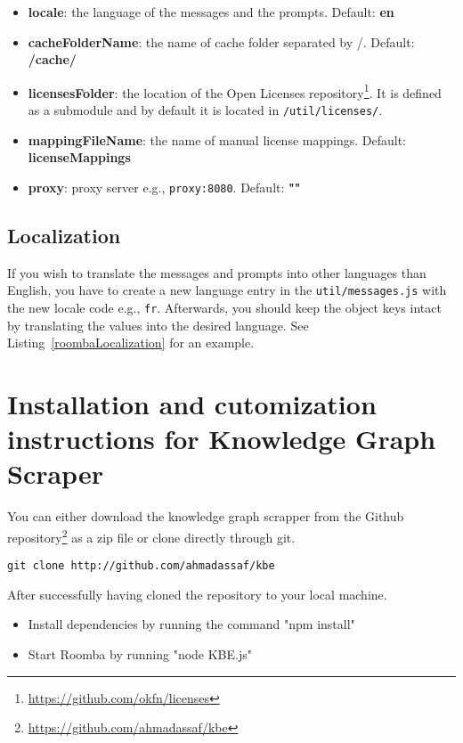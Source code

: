\begin{itemize}
	\item \textbf{locale}: the language of the messages and the prompts. Default: \textbf{en}
	\item \textbf{cacheFolderName}: the name of cache folder separated by /. Default: \textbf{/cache/}
	\item \textbf{licensesFolder}: the location of the Open Licenses repository\footnote{\url{https://github.com/okfn/licenses}}. It is defined as a submodule and by default it is located in \texttt{/util/licenses/}.
	\item \textbf{mappingFileName}: the name of manual license mappings. Default: \textbf{licenseMappings}
	\item \textbf{proxy}: proxy server e.g., \texttt{proxy:8080}. Default: \textbf{""}
\end{itemize}

\subsection{Localization}

If you wish to translate the messages and prompts into other languages than English, you have to create a new language entry in the \texttt{util/messages.js} with the new locale code e.g., \texttt{fr}. Afterwards, you should keep the object keys intact by translating the values into the desired language. See Listing~\ref{roombaLocalization} for an example.



\section{Installation and cutomization instructions for Knowledge Graph Scraper}
\label{section:installation_KGB}

You can either download the knowledge graph scrapper from the Github repository\footnote{\url{https://github.com/ahmadassaf/kbe}} as a zip file or clone directly through git.

\begin{verbatim}
git clone http://github.com/ahmadassaf/kbe
\end{verbatim}

After successfully having cloned the repository to your local machine.
\begin{itemize}
	\item Install dependencies by running the command "npm install"
	\item Start Roomba by running "node KBE.js"
\end{itemize}

